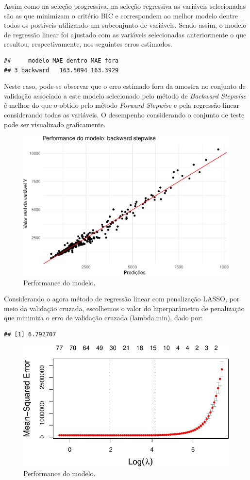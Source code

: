 \documentclass[11pt,]{article}
\begin{document}
\noindent Assim como na seleção progressiva, na seleção regressiva as
variáveis selecionadas são as que minimizam o critério BIC e
correspondem ao melhor modelo dentre todos os possíveis utilizando um
subconjunto de variáveis. Sendo assim, o modelo de regressão linear foi
ajustado com as variáveis selecionadas anteriormente o que resultou,
respectivamente, nos seguintes erros estimados.

\begin{verbatim}
##     modelo MAE dentro MAE fora
## 3 backward   163.5094 163.3929
\end{verbatim}

\noindent Neste caso, pode-se observar que o erro estimado fora da
amostra no conjunto de validação associado a este modelo selecionado
pelo método de \textit{Backward Stepwise} é melhor do que o obtido pelo
método \textit{Forward Stepwise} e pela regressão linear considerando
todas as variáveis. O desempenho considerando o conjunto de teste pode
ser visualizado graficamente.

\begin{figure}

{\centering \includegraphics[width=0.6\linewidth]{figs/unnamed-chunk-9} 

}

\caption{Performance do modelo.}\label{fig:unnamed-chunk-9}
\end{figure}

Considerando o agora método de regressão linear com penalização LASSO,
por meio da validação cruzada, escolhemos o valor do hiperparâmetro de
penalização que minimiza o erro de validação cruzada (lambda.min), dado
por:

\begin{verbatim}
## [1] 6.792707
\end{verbatim}

\begin{figure}

{\centering \includegraphics[width=0.6\linewidth]{figs/unnamed-chunk-10} 

}

\caption{Performance do modelo.}\label{fig:unnamed-chunk-10}
\end{figure}
\end{document}
